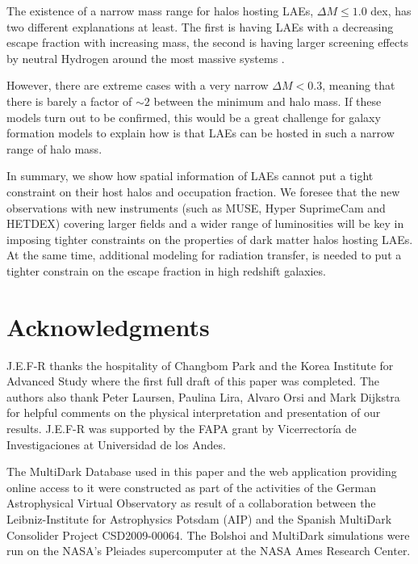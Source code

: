 \documentclass[usenatbib]{mn2e}
\newcommand{\ly}{{\ifmmode{{\rm Ly}\alpha}\else{Ly$\alpha$~}\fi}}
\begin{document}
The existence of a narrow mass range for halos hosting LAEs, $\Delta
M\leq 1.0$ dex, has two different explanations at least. The
first is having LAEs with a decreasing \ly escape fraction with
increasing mass, the second is having larger screening effects by
neutral Hydrogen around the most massive systems
\citep{Laursen2009,ForeroRomero2011}.   

However, there are extreme cases with a very narrow $\Delta M<0.3$, meaning that
there is barely a factor of $\sim 2$ between the minimum and halo
mass. If these models turn out to be confirmed, this would be a great
challenge for galaxy formation models to explain how is that LAEs can
be hosted in such a narrow range of halo mass. 

In summary, we show how spatial information of LAEs cannot
put a tight constraint on their host halos and occupation fraction. We
foresee that the new observations with new instruments (such as MUSE,
Hyper SuprimeCam and HETDEX) covering larger fields and a wider range
of luminosities will be key in imposing tighter constraints on the
properties of dark matter halos hosting LAEs. At the same time,
additional modeling for \ly radiation transfer, is needed to put a
tighter constrain on the \ly escape fraction in high redshift
galaxies. 


\section*{Acknowledgments} 
J.E.F-R thanks the hospitality of Changbom Park and the Korea
Institute for Advanced Study where the first full draft of this paper
was completed. The authors also thank Peter Laursen, Paulina Lira, 
Alvaro Orsi and Mark Dijkstra for helpful comments on the physical
interpretation and presentation of our results. J.E.F-R was
supported by the FAPA grant by Vicerrector\'ia de Investigaciones at
Universidad de los Andes.

The MultiDark Database used in this paper and the web application
providing online access to it were constructed as part of the
activities of the German Astrophysical Virtual Observatory as result
of a collaboration between the Leibniz-Institute for Astrophysics
Potsdam (AIP) and the Spanish MultiDark Consolider Project
CSD2009-00064. The Bolshoi and MultiDark simulations were run on the
NASA's Pleiades supercomputer at the NASA Ames Research Center.




 
\end{document}
